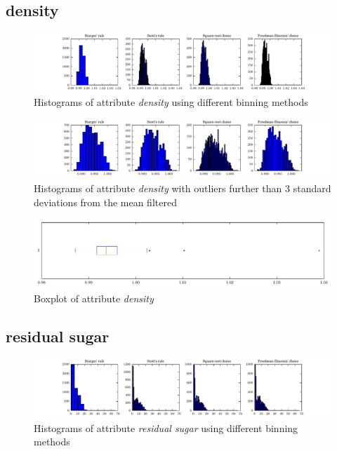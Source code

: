 \documentclass{report}
\begin{document}
\newpage\subsection{density}
\begin{figure}[H]
\includegraphics[width=\textwidth]{histograms/density.pdf}
\caption{Histograms of attribute \emph{density} using different binning methods}\end{figure}

\begin{figure}[H]
\includegraphics[width=\textwidth]{histograms/density_filtered.pdf}
\caption{Histograms of attribute \emph{density} with outliers further than 3 standard deviations from the mean filtered}\n\end{figure}

\begin{figure}[H]
\includegraphics[width=\textwidth]{boxplots/density.pdf}
\caption{Boxplot of attribute \emph{density}}\end{figure}

\newpage\subsection{residual sugar}
\begin{figure}[H]
\includegraphics[width=\textwidth]{histograms/residual_sugar.pdf}
\caption{Histograms of attribute \emph{residual sugar} using different binning methods}\end{figure}
\end{document}
